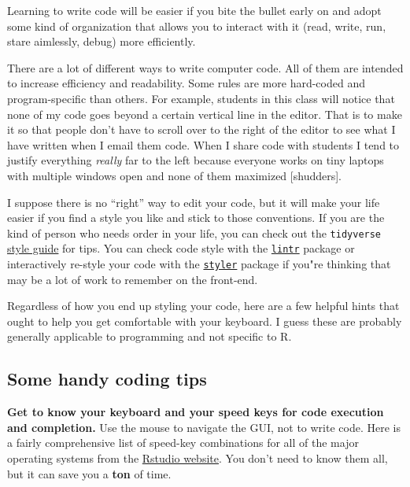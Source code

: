 \documentclass[
]{book}
\begin{document}
Learning to write code will be easier if you bite the bullet early on and adopt some kind of organization that allows you to interact with it (read, write, run, stare aimlessly, debug) more efficiently.

There are a lot of different ways to write computer code. All of them are intended to increase efficiency and readability. Some rules are more hard-coded and program-specific than others. For example, students in this class will notice that none of my code goes beyond a certain vertical line in the editor. That is to make it so that people don't have to scroll over to the right of the editor to see what I have written when I email them code. When I share code with students I tend to justify everything \emph{really} far to the left because everyone works on tiny laptops with multiple windows open and none of them maximized {[}shudders{]}.

I suppose there is no ``right'' way to edit your code, but it will make your life easier if you find a style you like and stick to those conventions. If you are the kind of person who needs order
in your life, you can check out the \texttt{tidyverse} \href{https://style.tidyverse.org/documentation.html}{style guide} for tips. You can check code style with the \href{https://github.com/jimhester/lintr}{\texttt{lintr}} package or interactively re-style your code with the \href{https://styler.r-lib.org/}{\texttt{styler}} package if you"re thinking that may be a lot of work to remember on the front-end.

Regardless of how you end up styling your code, here are a few helpful hints that ought to help you get comfortable with your keyboard. I guess these are probably generally applicable to programming and not specific to R.

\hypertarget{tips}{%
\subsection*{Some handy coding tips}\label{tips}}

\textbf{Get to know your keyboard and your speed keys for code execution and completion.} Use the mouse to navigate the GUI, not to write code. Here is a fairly comprehensive list of speed-key combinations for all of the major operating systems from the \href{https://support.rstudio.com/hc/en-us/articles/200711853-Keyboard-Shortcuts}{Rstudio website}. You don't need to know them all, but it can save you a \textbf{ton} of time.
\end{document}
